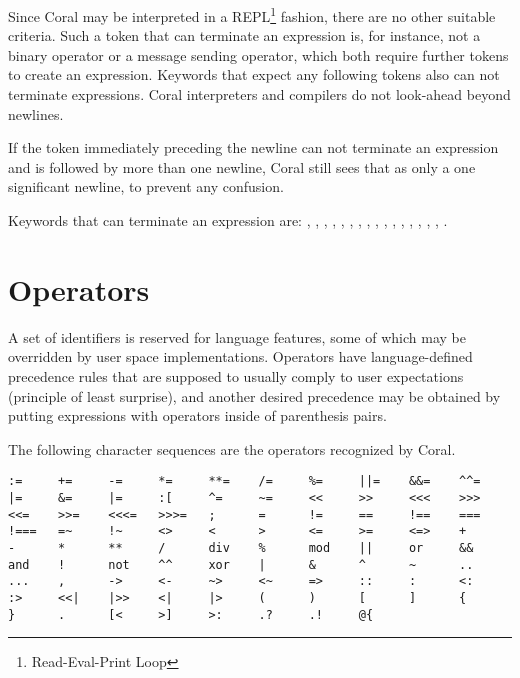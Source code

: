 Since Coral may be interpreted in a REPL\footnote{Read-Eval-Print Loop} fashion, there are no other suitable criteria. Such a token that can terminate an expression is, for instance, not a binary operator or a message sending operator, which both require further tokens to create an expression. Keywords that expect any following tokens also can not terminate expressions. Coral interpreters and compilers do not look-ahead beyond newlines.

If the token immediately preceding the newline can not terminate an expression and is followed by more than one newline, Coral still sees that as only a one significant newline, to prevent any confusion.

Keywords that can terminate an expression are: \lstinline@break@, \lstinline@end@, \lstinline@opaque@, \lstinline@native@, \lstinline@next@, \lstinline@nil@, \lstinline@no@, \lstinline@redo@, \lstinline@retry@, \lstinline@return@, \lstinline@self@, \lstinline@skip@, \lstinline@super@, \lstinline@this@, \lstinline@transparent@, \lstinline@yes@, \lstinline@yield@.

\section{Operators}\label{sec:operators}

A set of identifiers is reserved for language features, some of which may be overridden by user space implementations. Operators have language-defined precedence rules that are supposed to usually comply to user expectations (principle of least surprise), and another desired precedence may be obtained by putting expressions with operators inside of parenthesis pairs. 

The following character sequences are the operators recognized by Coral. 

\begin{lstlisting}
:=     +=     -=     *=     **=    /=     %=     ||=    &&=    ^^= 
|=     &=     |=     :[     ^=     ~=     <<     >>     <<<    >>> 
<<=    >>=    <<<=   >>>=   ;      =      !=     ==     !==    === 
!===   =~     !~     <>     <      >      <=     >=     <=>    + 
-      *      **     /      div    %      mod    ||     or     && 
and    !      not    ^^     xor    |      &      ^      ~      .. 
...    ,      ->     <-     ~>     <~     =>     ::     :      <: 
:>     <<|    |>>    <|     |>     (      )      [      ]      { 
}      .      [<     >]     >:     .?     .!     @{
\end{lstlisting}

